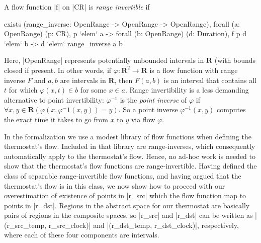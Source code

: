 \documentclass[runningheads]{llncs}
\def\phi{\varphi}
\newcommand{\IR}{{\mathbf R}}
\begin{document}
A flow function |f| on |CR| is {\em range invertible\/} if
\begin{code}
  exists (range_inverse: OpenRange -> OpenRange -> OpenRange),
    forall (a: OpenRange) (p: CR), p `elem` a ->
    forall (b: OpenRange) (d: Duration), f p d `elem` b -> d `elem` range_inverse a b
\end{code}
Here, |OpenRange| represents potentially unbounded intervals in $\IR$
(with bounds closed if present. In other words, if $\phi : \IR^2
\rightarrow \IR$ is a flow function with range inverse $F$ and $a,b$
are intervals in $\IR$, then $F(a,b)$ is an interval that contains all
$t$ for which $\phi(x,t)\in b$ for some $x\in a$. 
Range invertibility is a less demanding alternative to point invertibility: $\phi^{-1}$ is the {\em point inverse\/} of $\phi$ if $\forall x,y\in \IR (\phi (x, \phi^-1(x,y)) =y)$. So a point inverse $\phi^{-1}(x,y)$ computes the exact time it takes to go from $x$ to $y$ via flow $\phi$.

In the formalization we use a modest library
of flow functions when defining the thermostat's flow. Included in
that library are range-inverses, which consequently automatically
apply to the thermostat's flow. Hence, no ad-hoc work is needed to
show that the thermostat's flow functions are range-invertible.
Having defined the class of separable range-invertible flow functions,
and having argued that the thermostat's flow is in this class, we now
show how to proceed with our overestimation of existence of points in
|r_src| which the flow function map to points in |r_dst|. 
Regions in the abstract space for our thermostat are basically pairs
of regions in the composite spaces, so |r_src| and |r_dst| can be
written as |(r_src_temp, r_src_clock)| and |(r_dst_temp,
r_dst_clock)|, respectively, where each of these four components are
intervals.
\end{document}
